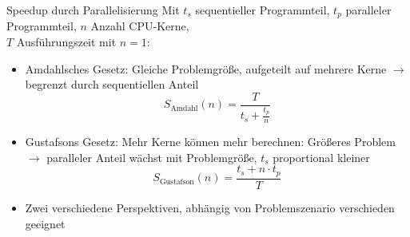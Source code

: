 \begin{frame}[c, fragile]{Speedup durch Parallelisierung}{}
	Mit $t_s$ sequentieller Programmteil, $t_p$ paralleler Programmteil, $n$ Anzahl CPU-Kerne,\\$T$ Ausführungszeit mit $n=1$:
	\begin{itemize}
		\item Amdahlsches Gesetz:
		      Gleiche Problemgröße, aufgeteilt auf mehrere Kerne $\rightarrow$ begrenzt durch sequentiellen Anteil
		      \[S_{\textrm{Amdahl}}(n)=\frac{T}{t_s+\frac{t_p}{n}}\]
		\item Gustafsons Gesetz:
		      Mehr Kerne können mehr berechnen: Größeres Problem$\rightarrow$ paralleler Anteil wächst mit Problemgröße, $t_s$ proportional kleiner
		      \[S_{\textrm{Gustafson}}(n)=\frac{t_s+n\cdot t_p}{T}\]
		\item Zwei verschiedene Perspektiven, abhängig von Problemszenario verschieden geeignet
	\end{itemize}
\end{frame}

